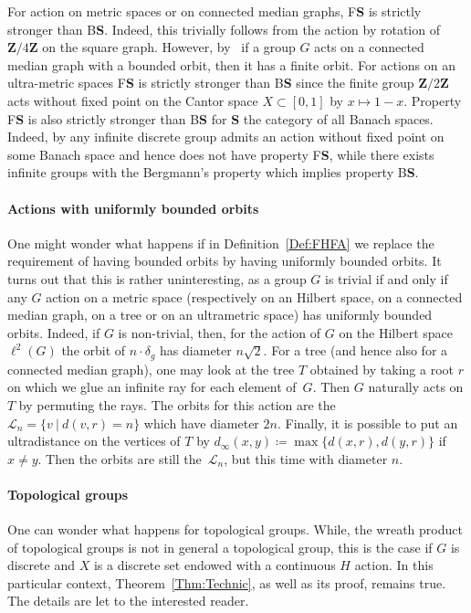 \documentclass[a4paper]{article}
\theoremstyle{definition}
\newtheorem{rem}[lem]{Remark}
\newcommand*{\field}[1]{\mathbf{#1}}
\newcommand*{\category}[1]{\textbf{#1}}
\newcommand*{\CatS}{\category{S}}
\newcommand*{\Z}{\field{Z}}
\newcommand*{\BS}{B\textbf{S}}
\newcommand*{\FS}{F\textbf{S}}
\newcommand{\setst}[2]{\{#1\ |\ #2\}}
\begin{document}
For action on metric spaces or on connected median graphs, \FS{} is strictly stronger than \BS.
Indeed, this trivially follows from the action by rotation of $\Z/4\Z$ on the square graph.
However,  by~\cite{Cornulier2013,MR1663779} if a group $G$ acts on a connected median graph with a bounded orbit, then it has a finite orbit.
For actions on an ultra-metric spaces \FS{} is strictly stronger than \BS{} since the finite group  $\Z/2\Z$ acts without fixed point on the Cantor space $X\subset[0,1]$ by $x\mapsto 1-x$.
Property \FS{} is also strictly stronger than \BS{} for \CatS{} the category of all Banach spaces. Indeed, by \cite{MR2656670} any infinite discrete group admits an action without fixed point on some Banach space and hence does not have property \FS, while there exists infinite groups with the Bergmann's property which implies property \BS.
%
%
%
%
%
\paragraph{Actions with uniformly bounded orbits}
One might wonder what happens if in Definition~\ref{Def:FHFA} we replace the requirement of having bounded orbits by having uniformly bounded orbits.
It turns out that this is rather uninteresting, as a group $G$ is trivial if and only if any $G$ action on a metric space (respectively on an Hilbert space, on a connected median graph, on a tree or on an ultrametric space) has uniformly bounded orbits.
Indeed, if $G$ is non-trivial, then, for the action of $G$ on the Hilbert space $\ell^2(G)$ the orbit of $n\cdot \delta_g$ has diameter $n\sqrt2$.
For a tree (and hence also for a connected median graph), one may look at the tree $T$ obtained by taking a root $r$ on which we glue an infinite ray for each element of~$G$.
Then $G$ naturally acts on $T$ by permuting the rays.
The orbits for this action are the $\mathcal L_n=\setst{v}{d(v,r)=n}$ which have diameter $2n$.
Finally, it is possible to put an ultradistance on the vertices of $T$ by  $d_\infty(x,y)\coloneqq\max\{d(x,r),d(y,r)\}$ if $x\neq y$.
Then the orbits are still the~$\mathcal L_n$, but this time with diameter $n$.
%
%
%
\paragraph{Topological groups}
One can wonder what happens for topological groups. While, the wreath product of topological groups is not in general a topological group, this is the case if $G$ is discrete and $X$ is a discrete set endowed with a continuous $H$ action.
In this particular context, Theorem~\ref{Thm:Technic}, as well as its proof, remains true.
The details are let to the interested reader.
%
%
%
\end{document}
